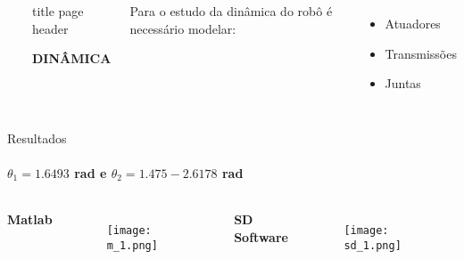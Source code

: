  \begin{frame}
    \begin{columns}
        ~\hfill
            \begin{beamercolorbox}[sep=8em, colsep*=18pt, wd=\textwidth,ht=\paperheight]{title page header}
                \begin{center}
                    \textbf{\huge{DINÂMICA}}\par
                \end{center}
            \end{beamercolorbox}%
            
        \Large
        Para o estudo da dinâmica do robô é necessário modelar:
        \vspace{.4cm}
        \begin{itemize}
            \item Atuadores
            \item Transmissões
            \item Juntas
        \end{itemize}
    \end{columns}
  
 \end{frame}
\begin{frame}[c]{Resultados} 
    \framesubtitle{$\theta_{1}=1.6493$ rad e $\theta_{2}=1.475-2.6178$ rad}
    \begin{columns}
        \begin{center}
            \Large \textbf{Matlab}\\     
        \end{center}
        \begin{figure}
            \texttt{[image: m\_1.png]}
        \end{figure}
        \begin{center}
            \Large \textbf{SD Software}\\    
        \end{center}
        \begin{figure}
            \texttt{[image: sd\_1.png]}
        \end{figure}
              
    \end{columns}
\end{frame}
